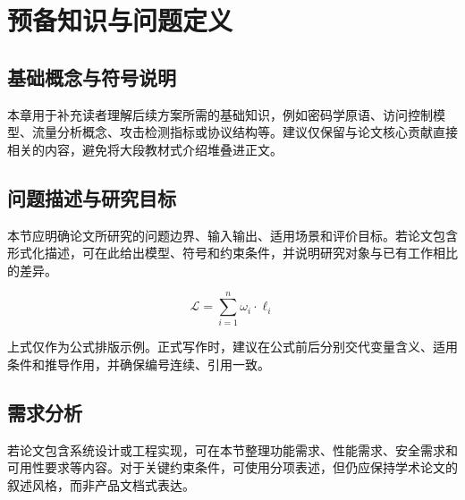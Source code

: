 \section{预备知识与问题定义}

\subsection{基础概念与符号说明}

本章用于补充读者理解后续方案所需的基础知识，例如密码学原语、访问控制模型、流量分析概念、攻击检测指标或协议结构等。建议仅保留与论文核心贡献直接相关的内容，避免将大段教材式介绍堆叠进正文。

\subsection{问题描述与研究目标}

本节应明确论文所研究的问题边界、输入输出、适用场景和评价目标。若论文包含形式化描述，可在此给出模型、符号和约束条件，并说明研究对象与已有工作相比的差异。

\begin{equation}
  \mathcal{L} = \sum_{i=1}^{n} \omega_i \cdot \ell_i
\end{equation}

上式仅作为公式排版示例。正式写作时，建议在公式前后分别交代变量含义、适用条件和推导作用，并确保编号连续、引用一致。

\subsection{需求分析}

若论文包含系统设计或工程实现，可在本节整理功能需求、性能需求、安全需求和可用性要求等内容。对于关键约束条件，可使用分项表述，但仍应保持学术论文的叙述风格，而非产品文档式表达。
